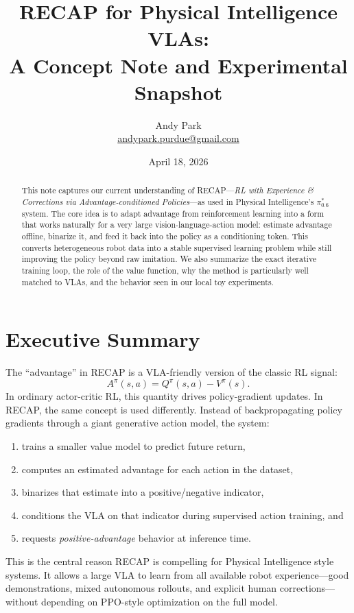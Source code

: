 \documentclass[11pt]{article}
\title{RECAP for Physical Intelligence VLAs:\\A Concept Note and Experimental Snapshot}
\author{Andy Park\\\href{mailto:andypark.purdue@gmail.com}{andypark.purdue@gmail.com}}
\date{April 18, 2026}
\begin{document}
\maketitle

\begin{abstract}
This note captures our current understanding of RECAP---\emph{RL with Experience \& Corrections via Advantage-conditioned Policies}---as used in Physical Intelligence's $\pi^{*}_{0.6}$ system. The core idea is to adapt advantage from reinforcement learning into a form that works naturally for a very large vision-language-action model: estimate advantage offline, binarize it, and feed it back into the policy as a conditioning token. This converts heterogeneous robot data into a stable supervised learning problem while still improving the policy beyond raw imitation. We also summarize the exact iterative training loop, the role of the value function, why the method is particularly well matched to VLAs, and the behavior seen in our local toy experiments.
\end{abstract}

\section{Executive Summary}

The ``advantage'' in RECAP is a VLA-friendly version of the classic RL signal:
\[
A^{\pi}(s, a) = Q^{\pi}(s, a) - V^{\pi}(s).
\]
In ordinary actor-critic RL, this quantity drives policy-gradient updates. In RECAP, the same concept is used differently. Instead of backpropagating policy gradients through a giant generative action model, the system:
\begin{enumerate}[leftmargin=1.5em]
  \item trains a smaller value model to predict future return,
  \item computes an estimated advantage for each action in the dataset,
  \item binarizes that estimate into a positive/negative indicator,
  \item conditions the VLA on that indicator during supervised action training, and
  \item requests \emph{positive-advantage} behavior at inference time.
\end{enumerate}

This is the central reason RECAP is compelling for Physical Intelligence style systems. It allows a large VLA to learn from all available robot experience---good demonstrations, mixed autonomous rollouts, and explicit human corrections---without depending on PPO-style optimization on the full model.
\end{document}
